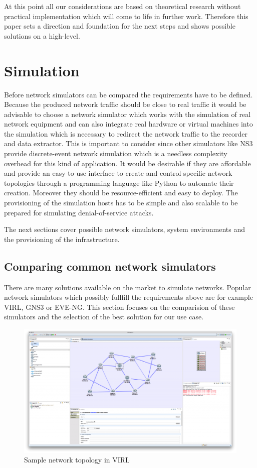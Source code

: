 \documentclass[conference]{IEEEtran}
\begin{document}
At this point all our considerations are based on theoretical research  without practical implementation which will come to life in further work. Therefore this paper sets a direction and foundation for the next steps and shows possible solutions on a high-level.

\section{Simulation}

Before network simulators can be compared the requirements have to be defined. Because the produced network traffic should be close to real traffic it would be advisable to choose a network simulator which works with the simulation of real network equipment and can also integrate real hardware or virtual machines into the simulation which is necessary to redirect the network traffic to the recorder and data extractor. This is important to consider since other simulators like NS3 provide discrete-event network simulation which is a needless complexity overhead for this kind of application. It would be desirable if they are affordable and provide an easy-to-use interface to create and control specific network topologies through a programming language like Python to automate their creation. Moreover they should be resource-efficient and easy to deploy. The provisioning of the simulation hosts has to be simple and also scalable to be prepared for simulating denial-of-service attacks.

The next sections cover possible network simulators, system environments and the provisioning of the infrastructure.

\subsection{Comparing common network simulators}
There are many solutions available on the market to simulate networks. Popular network simulators which possibly fullfill the requirements above are for example VIRL, GNS3 or EVE-NG. This section focuses on the comparision of these simulators and the selection of the best solution for our use case.  \cite{b1}

\begin{figure}[htbp]
\centerline{\includegraphics[scale=0.55]{virl.png}}
\caption{Sample network topology in VIRL \cite{b2}}
\label{virl}
\end{figure}
\end{document}
